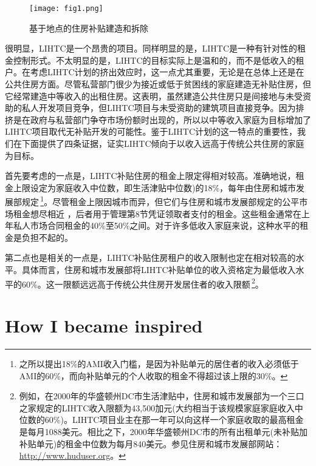 \documentclass[lang=cn,11pt,a4paper]{paper}
\begin{document}
\begin{figure}[h]
	\centering
	\texttt{[image: fig1.png]}
	\caption{基于地点的住房补贴建造和拆除}\label{fig1}
\end{figure}

很明显，LIHTC是一个昂贵的项目。同样明显的是，LIHTC是一种有针对性的租金控制形式。不太明显的是，LIHTC的目标实际上是温和的，而不是低收入的租户。在考虑LIHTC计划的挤出效应时，这一点尤其重要，无论是在总体上还是在公共住房方面。尽管私营部门很少为接近或低于贫困线的家庭建造无补贴住房，但它经常建造中等收入的出租住房。这表明，虽然建造公共住房只是间接地与未受资助的私人开发项目竞争，但LIHTC项目与未受资助的建筑项目直接竞争。因为排挤是在政府与私营部门争夺市场份额时出现的，所以以中等收入家庭为目标增加了LIHTC项目取代无补贴开发的可能性。鉴于LIHTC计划的这一特点的重要性，我们在下面提供了四条证据，证实LIHTC倾向于以收入远高于传统公共住房的家庭为目标。

首先要考虑的一点是，LIHTC补贴住房的租金上限定得相对较高。准确地说，租金上限设定为家庭收入中位数，即生活津贴中位数)的18\%，每年由住房和城市发展部规定\,\footnote{之所以提出18\%的AMI收入门槛，是因为补贴单元的居住者的收入必须低于AMI的60\%，而向补贴单元的个人收取的租金不得超过该上限的30\%。}。尽管租金上限因城市而异，但它们与住房和城市发展部规定的公平市场租金想尽相近 \citep{Cummings1999257}，后者用于管理第8节凭证领取者支付的租金。这些租金通常在上年私人市场合同租金的40\%至50\%之间。对于许多低收入家庭来说，这种水平的租金是负担不起的。

第二点也是相关的一点是，LIHTC补贴住房租户的收入限制也定在相对较高的水平。具体而言，住房和城市发展部将LIHTC补贴单位的收入资格定为最低收入水平的60\%。这一限额远远高于传统公共住房开发居住者的收入限额\,\footnote{例如，在2000年的华盛顿州DC市生活津贴中，住房和城市发展部为一个三口之家规定的LIHTC收入限额为43,500加元(大约相当于该规模家庭家庭收入中位数的60\%)。LIHTC项目业主在那一年可以向这样一个家庭收取的最高租金是每月1088美元。相比之下，2000年华盛顿州DC市的所有出租单元(未补贴加补贴单元)的租金中位数为每月840美元。参见住房和城市发展部网站：\url{http://www.huduser.org}。}。




\appendix
\appendixpage
\addappheadtotoc
\section{How I became inspired}
\end{document}
